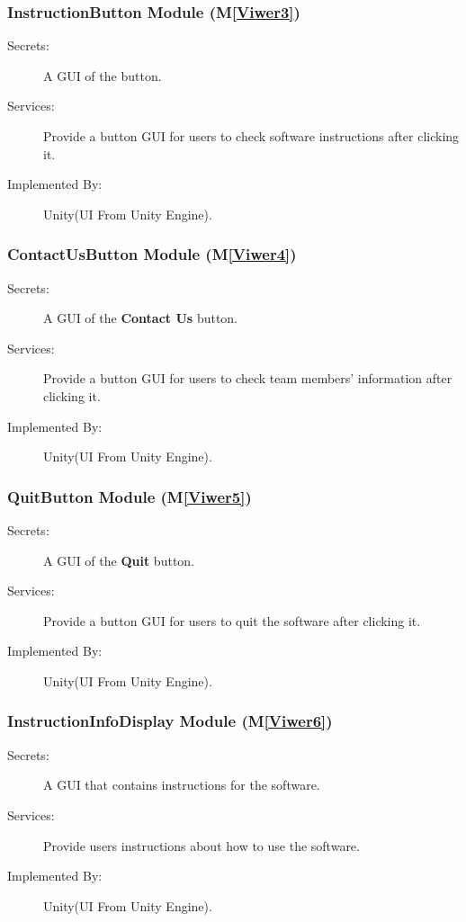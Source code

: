 \documentclass[12pt, titlepage]{article}
\newcommand{\mref}[1]{M\ref{#1}}
\begin{document}
\subsubsection{InstructionButton Module (\mref{Viwer3})}
\begin{description}
\item[Secrets:] A GUI of the \bt button.
\item[Services:] Provide a button GUI for users to check software instructions after 
clicking it.
\item[Implemented By:] Unity(UI From Unity Engine).
\end{description}

\renewcommand\bt{\textbf{Contact Us }}
\subsubsection{ContactUsButton Module (\mref{Viwer4})}
\begin{description}
\item[Secrets:] A GUI of the \bt button.
\item[Services:] Provide a button GUI for users to check team members' information after 
clicking it.
\item[Implemented By:] Unity(UI From Unity Engine).
\end{description}

\renewcommand\bt{\textbf{Quit }}
\subsubsection{QuitButton Module (\mref{Viwer5})}
\begin{description}
\item[Secrets:] A GUI of the \bt button.
\item[Services:] Provide a button GUI for users to quit the software after 
clicking it.
\item[Implemented By:] Unity(UI From Unity Engine).
\end{description}

\subsubsection{InstructionInfoDisplay Module (\mref{Viwer6})}
\begin{description}
\item[Secrets:] A GUI that contains instructions for the software.
\item[Services:] Provide users instructions about how to use the software.
\item[Implemented By:] Unity(UI From Unity Engine).
\end{description}
\end{document}
